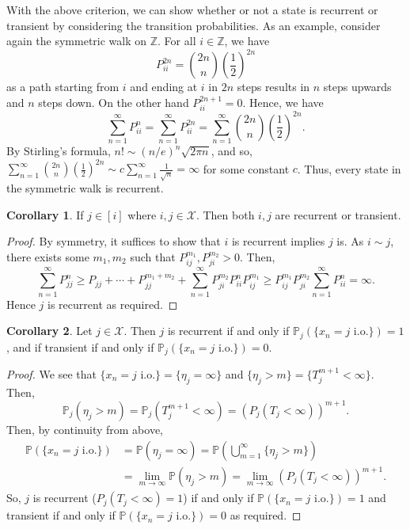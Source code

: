 \documentclass[]{article}
\theoremstyle{definition}
\newtheorem{corollary}{Corollary}[theorem]
\theoremstyle{definition}
\begin{document}
With the above criterion, we can show whether or not a state is recurrent or transient 
by considering the transition probabilities. As an example, consider again the symmetric 
walk on \(\mathbb{Z}\). For all \(i \in \mathbb{Z}\), we have 
\[P_{ii}^{2n} = {2n \choose n} \left(\frac{1}{2}\right)^{2n}\]
as a path starting from \(i\) and ending at \(i\) in \(2n\) steps results in \(n\) 
steps upwards and \(n\) steps down. On the other hand \(P_{ii}^{2n + 1} = 0\). 
Hence, we have 
\[\sum_{n = 1}^\infty P_{ii}^n = \sum_{n = 1}^\infty P_{ii}^{2n} = 
  \sum_{n = 1}^\infty {2n \choose n} \left(\frac{1}{2}\right)^{2n}.\]
By Stirling's formula, \(n! \sim (n / e)^n \sqrt{2\pi n}\), and so, 
\(\sum_{n = 1}^\infty {2n \choose n} \left(\frac{1}{2}\right)^{2n} \sim 
  c \sum_{n = 1}^\infty \frac{1}{\sqrt{n}} = \infty\)
for some constant \(c\). Thus, every state in the symmetric walk is recurrent. 

\begin{corollary}
  If \(j \in [i]\) where \(i, j \in \mathcal{X}\). Then both \(i, j\) are recurrent 
  or transient.
\end{corollary}
\begin{proof}
  By symmetry, it suffices to show that \(i\) is recurrent implies \(j\) is. 
  As \(i \sim j\), there exists some \(m_1, m_2\) such that \(P_{ij}^{m_1}, P_{ji}^{m_2} > 0\). 
  Then, 
  \[\sum_{n = 1}^\infty P_{jj}^n \ge P_{jj} + \cdots + P_{jj}^{m_1 + m_2} + 
    \sum_{n = 1}^\infty P_{ji}^{m_2} P_{ii}^n P_{ij}^{m_1} 
    \ge P_{ij}^{m_1} P_{ji}^{m_2} \sum_{n = 1}^\infty P_{ii}^n = \infty.\]
  Hence \(j\) is recurrent as required.
\end{proof}

\begin{corollary}
  Let \(j \in \mathcal{X}\). Then \(j\) is recurrent if and only if 
  \(\mathbb{P}_j(\{x_n = j \text{ i.o.}\}) = 1\), and if transient if and only 
  if \(\mathbb{P}_j(\{x_n = j \text{ i.o.}\}) = 0\).
\end{corollary}
\begin{proof}
  We see that \(\{x_n = j \text{ i.o.}\} = \{\eta_j = \infty\}\) and 
  \(\{\eta_j > m\} = \{T_j^{m + 1} < \infty\}\). Then, 
  \[\mathbb{P}_j(\eta_j > m) = \mathbb{P}_j(T_j^{m + 1} < \infty) = 
    (P_j(T_j < \infty))^{m + 1}.\]
  Then, by continuity from above, 
  \[\begin{split}
    \mathbb{P}(\{x_n = j \text{ i.o.}\}) & = 
    \mathbb{P}(\eta_j = \infty) = \mathbb{P}\left(\bigcup_{m = 1}^\infty\{\eta_j > m\}\right)\\
    & =
    \lim_{m \to \infty} \mathbb{P}(\eta_j > m) = \lim_{m \to \infty}(P_j(T_j < \infty))^{m + 1}.
    \end{split}\]
  So, \(j\) is recurrent (\(P_j(T_j < \infty) = 1\)) if and only if 
  \(\mathbb{P}(\{x_n = j \text{ i.o.}\}) = 1\) and transient if and only if 
  \(\mathbb{P}(\{x_n = j \text{ i.o.}\}) = 0\) as required.
\end{proof}
\end{document}
